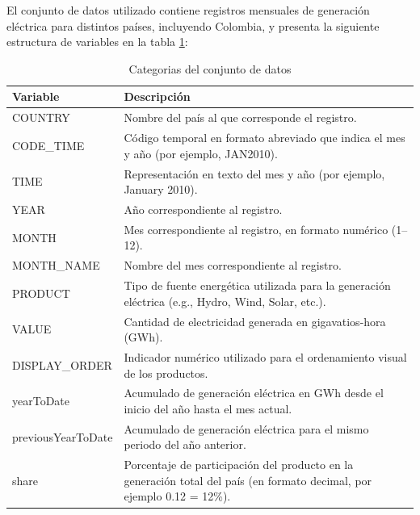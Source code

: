 \documentclass{article}
\begin{document}
El conjunto de datos utilizado contiene registros mensuales de generación eléctrica para distintos países, incluyendo Colombia, y presenta la siguiente estructura de variables en la tabla \ref{table:tab1}:

\begin{table}[h!]
	\begin{tabular}{|l|p{14cm}|}
		\hline
		\textbf{Variable}  & \textbf{Descripción}                                                                                                    \\ \hline
		COUNTRY            & Nombre del país al que corresponde el registro.                                                                         \\ \hline
		CODE\_TIME         & Código temporal en formato abreviado que indica el mes y año (por ejemplo, JAN2010).                                    \\ \hline
		TIME               & Representación en texto del mes y año (por ejemplo, January 2010).                                                      \\ \hline
		YEAR               & Año correspondiente al registro.                                                                                        \\ \hline
		MONTH              & Mes correspondiente al registro, en formato numérico (1–12).                                                            \\ \hline
		MONTH\_NAME        & Nombre del mes correspondiente al registro.                                                                             \\ \hline
		PRODUCT            & Tipo de fuente energética utilizada para la generación eléctrica (e.g., Hydro, Wind, Solar, etc.).                      \\ \hline
		VALUE              & Cantidad de electricidad generada en gigavatios-hora (GWh).                                                             \\ \hline
		DISPLAY\_ORDER     & Indicador numérico utilizado para el ordenamiento visual de los productos.                                              \\ \hline
		yearToDate         & Acumulado de generación eléctrica en GWh desde el inicio del año hasta el mes actual.                                   \\ \hline
		previousYearToDate & Acumulado de generación eléctrica para el mismo periodo del año anterior.                                               \\ \hline
		share              & Porcentaje de participación del producto en la generación total del país (en formato decimal, por ejemplo 0.12 = 12\%). \\ \hline
	\end{tabular}
	\caption{Categorias del conjunto de datos}\label{table:tab1}
\end{table}
\end{document}
